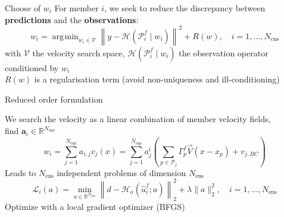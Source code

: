 \documentclass[aspectratio=169]{beamer} %
\DeclareMathOperator*{\argmin}{\arg\!\min}
\begin{document}
\begin{frame}{Choose of $w_i$}
    For member $i$, we seek to reduce the discrepancy between \textbf{predictions} and the \textbf{observations}:
    \begin{equation*}
        w_i = \argmin_{w_i \in \mathcal V} \left\|y - \mathcal H(\mathcal{P}_i^f \mid w_i) \right\|^2  + R(w), \quad i = 1, \dots, N_{\text{ens}}
    \end{equation*}with $\mathcal V$ the velocity search space, $\mathcal H(\mathcal{P}_i^f \mid w_i)$ the observation operator conditioned by $w_i$\\
    \vfill
    $R(w)$ is a regularisation term (avoid non-uniqueness and ill-conditioning)\\
    \vfill
\end{frame}

\begin{frame}{Reduced order formulation}

    We search the velocity as a linear combination of member velocity fields,\\
    find $\bm a_i \in \mathbb{R}^{N_{\text{ens}}}$ \\
    \begin{equation*}
        w_i = \sum_{j=1}^{N_{\text{ens}}} a_{i,j} v_j (x) = \sum_{j=1}^{N_{\text{ens}}} a^i_j \left(\sum_{p \in \mathcal P_j} \Gamma_p^f \vec{V}(x - x_p) + v_{j,BC} \right)
    \end{equation*}
    \vfill
    Leads to $N_{\text{ens}}$ independent problems of dimension $N_{\text{ens}}$ \\
    \begin{equation*}
        \mathcal L_i (a) = \min_{a \in \mathbb{R}^{N_{\text{ens}}}} \left\|d - \mathcal H_a(\hat u^f_i; a)\right\|^2_2 + \lambda \|a\|_2^2, \quad i = 1, \dots, N_{\text{ens}}
    \end{equation*}
    Optimize with a local gradient optimizer (BFGS)
    \vfill
\end{frame}
\end{document}
